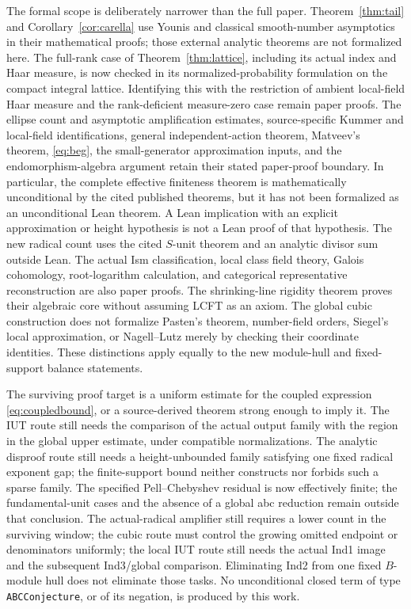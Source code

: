 \documentclass[11pt]{amsart}
\theoremstyle{definition}
\theoremstyle{remark}
\begin{document}
The formal scope is deliberately narrower than the full paper.
Theorem~\ref{thm:tail} and Corollary~\ref{cor:carella} use Younis and classical
smooth-number asymptotics in their mathematical proofs; those external
analytic theorems are not formalized here. The full-rank case of
Theorem~\ref{thm:lattice}, including its actual index and Haar measure,
is now checked in its normalized-probability formulation on the compact
integral lattice. Identifying this with the restriction of ambient
local-field Haar measure and the rank-deficient measure-zero case remain
paper proofs. The ellipse count and asymptotic amplification estimates,
source-specific Kummer and local-field identifications, general
independent-action theorem, Matveev's theorem, \eqref{eq:beg}, the
small-generator approximation inputs, and the endomorphism-algebra
argument retain their stated paper-proof boundary. In particular, the
complete effective finiteness theorem is mathematically unconditional
by the cited published theorems, but it has not been formalized as an
unconditional Lean theorem. A Lean implication with an explicit
approximation or height hypothesis is not a Lean proof of that hypothesis.
The new radical count uses the cited $S$-unit theorem and an analytic
divisor sum outside Lean. The actual Ism classification, local class field
theory, Galois cohomology, root-logarithm calculation, and categorical
representative reconstruction are also paper proofs. The shrinking-line
rigidity theorem proves their algebraic core without assuming LCFT as an
axiom. The global cubic construction does not formalize Pasten's theorem,
number-field orders, Siegel's local approximation, or Nagell--Lutz merely
by checking their coordinate identities. These distinctions apply equally
to the new module-hull and fixed-support balance statements.

The surviving proof target is a uniform estimate for the coupled expression
\eqref{eq:coupledbound}, or a source-derived theorem strong enough to imply
it. The IUT route still needs the comparison of the actual output family
with the region in the global upper estimate, under compatible
normalizations. The analytic disproof route still
needs a height-unbounded family satisfying one fixed radical exponent gap;
the finite-support bound neither constructs nor forbids such a sparse
family. The specified Pell--Chebyshev residual is now effectively finite;
the fundamental-unit cases and the absence of a global abc reduction remain
outside that conclusion. The actual-radical amplifier still requires a
lower count in the surviving window; the cubic route must control the
growing omitted endpoint or denominators uniformly; the local IUT route
still needs the actual Ind1 image and the subsequent Ind3/global
comparison. Eliminating Ind2 from one fixed $B$-module hull does not
eliminate those tasks. No unconditional closed term
of type \texttt{ABCConjecture}, or of its negation, is produced by this work.
\end{document}

